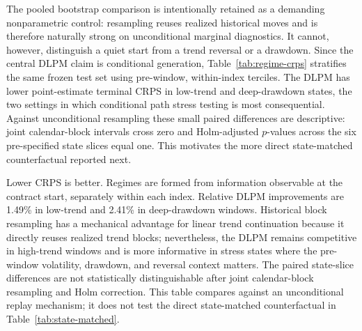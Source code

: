﻿\documentclass[12pt,letterpaper]{article}
\newcommand{\tabnote}[1]{\begin{minipage}{\linewidth}\vspace{4pt}\footnotesize\singlespacing #1\end{minipage}}
\begin{document}
The pooled bootstrap comparison is intentionally retained as a demanding
nonparametric control: resampling reuses realized historical moves and is
therefore naturally strong on unconditional marginal diagnostics. It cannot,
however, distinguish a quiet start from a trend reversal or a drawdown. Since
the central DLPM claim is conditional generation, Table~\ref{tab:regime-crps}
stratifies the same frozen test set using pre-window, within-index terciles.
The DLPM has lower point-estimate terminal CRPS in low-trend and deep-drawdown
states, the two settings in which conditional path stress testing is most
consequential. Against unconditional resampling these small paired differences
are descriptive: joint calendar-block intervals cross zero and Holm-adjusted
$p$-values across the six pre-specified state slices equal one. This motivates
the more direct state-matched counterfactual reported next.

\begin{table}[ht]
\singlespacing
\centering
\caption{Regime-stratified terminal CRPS: frozen DLPM versus historical block bootstrap}
\label{tab:regime-crps}
\tabnote{Lower CRPS is better. Regimes are formed from information observable
at the contract start, separately within each index. Relative DLPM improvements
are 1.49\% in low-trend and 2.41\% in deep-drawdown windows. Historical block
resampling has a mechanical advantage for linear trend continuation because it
directly reuses realized trend blocks; nevertheless, the DLPM remains
competitive in high-trend windows and is more informative in stress states
where the pre-window volatility, drawdown, and reversal context matters. The
paired state-slice differences are not statistically distinguishable after
joint calendar-block resampling and Holm correction. This table compares
against an unconditional replay mechanism; it does not test the direct
state-matched counterfactual in Table~\ref{tab:state-matched}.}
\end{table}
\end{document}
